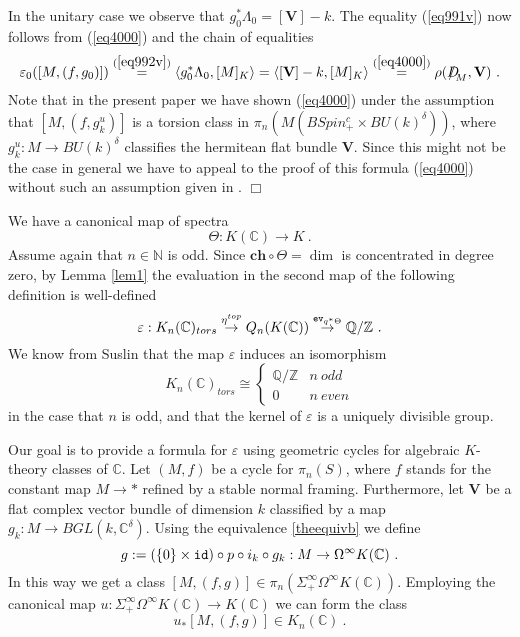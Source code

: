 \documentclass[12pt]{article}
\newcommand{\ev}{{\tt ev}}
\newcommand{\id}{{\tt id}}
\def\hB{\hspace*{\fill}$\Box$ \newline\noindent}
\newcommand{\nat}{{\mathbb{N}}}
\newcommand{\Z}{{\mathbb{Z}}}
\newcommand{\Q}{{\mathbb{Q}}}
\newcommand{\C}{{\mathbb{C}}}
\newcommand{\ch}{{\mathbf{ch}}}
\newcommand{\bV}{{\mathbf{V}}}
\newcommand{\Dirac}{{D\hspace{-0.27cm}/}}
\begin{document}
%
In the unitary case we observe that $g_{0}^{*}\Lambda_{0}=[\bV]-k$.  The equality (\ref{eq991v}) now follows from 
(\ref{eq4000}) and
the chain of equalities
$$\varepsilon_{0}([M,(f,g_{0})])\stackrel{(\ref{eq992v})}{=}\langle g_{0}^{*} \Lambda_{0}, [M]_{K}\rangle=\langle [\bV]-k, [M]_{K}\rangle \stackrel{(\ref{eq4000})}{=} \rho(\Dirac_{M},\bV)\ .$$
Note that in the present paper we have shown (\ref{eq4000}) under the assumption  that 
$ [M,(f,g_{k}^{u})]$ is a torsion class in $\pi_{n}(M(BSpin^{c}_{+}\times BU(k)^{\delta}))$,
where $g^{u}_{k}:M\to BU(k)^{\delta}$  classifies the hermitean flat bundle $\bV$.
 Since this might not be the case in general we have to appeal to the proof of this formula  (\ref{eq4000}) without such an assumption
given in \cite[Thm. 5.3]{MR0397799}.
\hB 

We have a canonical map of spectra
$$\Theta:K(\C)\to K\ .$$ Assume again that $n\in \nat$ is odd. Since
$\ch\circ \Theta=\dim$ is concentrated in degree zero, by Lemma 
 \ref{lem1}  the evaluation in the second map of the following definition is well-defined
 \begin{equation}\label{ephvjhee}\varepsilon:K_{n}(\C)_{tors}\stackrel{\eta^{top}}{\to} Q_{n}(K(\C))\stackrel{\ev_{q^{*}\Theta}}{\to}\Q/\Z\ .\end{equation}
We know from  Suslin \cite[Thm 4.9]{MR772065}  that the map $\varepsilon$ induces an isomorphism
 \begin{equation}\label{eq2100} K_{n}(\C)_{tors}\cong \left\{\begin{array}{cc}\Q/\Z&n\:odd\\0&n\:even\end{array}\right.
\end{equation} 
in the case  that $n$ is odd, and that the kernel of $\varepsilon$
is a uniquely divisible group.


Our goal is to provide a formula for $\varepsilon$ using geometric cycles for algebraic $K$-theory classes of $\C$.  Let $(M,f)$ be a cycle for $\pi_{n}(S)$, where $f$ stands for the constant map $M\to *$  refined by a stable normal framing. Furthermore, let $\bV$ be a flat complex vector bundle of dimension $k$ classified by a map $g_{k}:M\to BGL(k,\C^{\delta})$. Using the equivalence \eqref{theequivb} we define
$$g:=(\{0\}\times \id)\circ p\circ i_{k}\circ g_{k}:M\to \Omega^{\infty} K(\C)\ .$$   
In this way we get a class
$[M,(f,g)]\in \pi_{n}(\Sigma^{\infty}_{+}\Omega^{\infty}K(\C))$. Employing the canonical map
$u:\Sigma^{\infty}_{+}  \Omega^{\infty}K(\C) \to K(\C)$  we can form the class  $$u_{*}[M,(f,g)]\in K_{n}(\C)\ .$$
\end{document}

